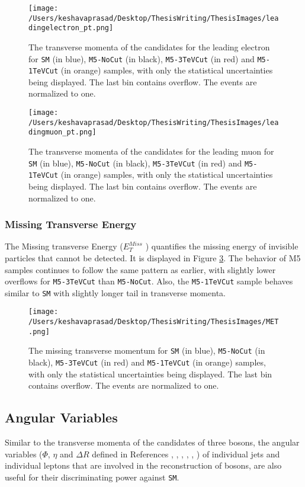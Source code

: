 \begin{figure}[!htb]
	\centering
	\texttt{[image: /Users/keshavaprasad/Desktop/ThesisWriting/ThesisImages/leadingelectron\_pt.png]}
	\caption{The transverse momenta of the candidates for the leading electron for \texttt{SM} (in blue), \texttt{M5-NoCut} (in black), \texttt{M5-3TeVCut} (in red) and \texttt{M5-1TeVCut} (in orange) samples, with only the statistical uncertainties being displayed. The last bin contains overflow. The events are normalized to one.}
	\label{leadingelectron-pt}
\end{figure}

\begin{figure}[!htb]
	\centering
	\texttt{[image: /Users/keshavaprasad/Desktop/ThesisWriting/ThesisImages/leadingmuon\_pt.png]}
	\caption{The transverse momenta of the candidates for the leading muon for \texttt{SM} (in blue), \texttt{M5-NoCut} (in black), \texttt{M5-3TeVCut} (in red) and \texttt{M5-1TeVCut} (in orange) samples, with only the statistical uncertainties being displayed. The last bin contains overflow. The events are normalized to one.}
	\label{leadingmuon-pt}
\end{figure}

\subsubsection{Missing Transverse Energy}
The Missing transverse Energy ($E^{Miss}_{T}$ ) quantifies the missing energy of invisible particles that cannot be detected. It is displayed in Figure \ref{MET}. The behavior of M5 samples continues to follow the same pattern as earlier, with slightly lower overflows for \texttt{M5-3TeVCut} than \texttt{M5-NoCut}. Also, the \texttt{M5-1TeVCut} sample behaves similar to \texttt{SM} with slightly longer tail in transverse momenta.
\begin{figure}[!htb]
	\centering
	\texttt{[image: /Users/keshavaprasad/Desktop/ThesisWriting/ThesisImages/MET.png]}
	\caption{The missing transverse momentum for \texttt{SM} (in blue), \texttt{M5-NoCut} (in black), \texttt{M5-3TeVCut} (in red) and \texttt{M5-1TeVCut} (in orange) samples, with only the statistical uncertainties being displayed. The last bin contains overflow. The events are normalized to one. }
	\label{MET}
\end{figure}

\subsection{Angular Variables}
Similar to the transverse momenta of the candidates of three bosons, the angular variables ($\Phi$, $\eta$ and $\Delta R$  defined in References \cite{Sahoo:2016hln}, \cite{PhiEtaPt}, \cite{CDF-Coordinates}, \cite{LHC-Physics-Bristol}, \cite{Accelerators}, \cite{Baden-Kinematics}) of individual jets and individual leptons that are involved in the reconstruction of bosons, are also useful for their discriminating power against \texttt{SM}.

